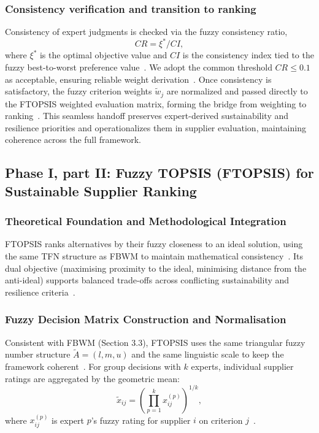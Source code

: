 \documentclass[preprint,12pt]{elsarticle}
\begin{document}
\subsubsection{Consistency verification and transition to ranking}
Consistency of expert judgments is checked via the fuzzy consistency ratio,
\[
CR=\xi^*/CI,
\]
where $\xi^*$ is the optimal objective value and $CI$ is the consistency index tied to the fuzzy best-to-worst preference value~\citep{rezaei_2019_nonlinear_bwm,guo_zhao_2017_fbwm}. We adopt the common threshold $CR \le 0.1$ as acceptable, ensuring reliable weight derivation~\citep{haseli_2024_sf_bwm_cis}.
Once consistency is satisfactory, the fuzzy criterion weights $\tilde{w}_j$ are normalized and passed directly to the FTOPSIS weighted evaluation matrix, forming the bridge from weighting to ranking~\citep{Afrasiabi_Tavana_DiCaprio_2022,petrovic_etal_2022_axioms_efqm_fbwm_fmoora}. This seamless handoff preserves expert-derived sustainability and resilience priorities and operationalizes them in supplier evaluation, maintaining coherence across the full framework.

\subsection{Phase I, part II: Fuzzy TOPSIS (FTOPSIS) for Sustainable Supplier Ranking}

\subsubsection{Theoretical Foundation and Methodological Integration}
FTOPSIS ranks alternatives by their fuzzy closeness to an ideal solution, using the same TFN structure as FBWM to maintain mathematical consistency~\citep{saleem_etal_2025_fuzzy_topsis_gscm,zare_etal_2023_pf_bwm_supplier}. Its dual objective (maximising proximity to the ideal, minimising distance from the anti-ideal) supports balanced trade-offs across conflicting sustainability and resilience criteria~\citep{amiri_aref_etal_2012_new_fuzzy_pnis_topsis}.

\subsubsection{Fuzzy Decision Matrix Construction and Normalisation}
Consistent with FBWM (Section 3.3), FTOPSIS uses the same triangular fuzzy number structure $\tilde{A}=(l,m,u)$ and the same linguistic scale to keep the framework coherent~\citep{zare_etal_2023_pf_bwm_supplier}.
For group decisions with $k$ experts, individual supplier ratings are aggregated by the geometric mean:
\[
\tilde{x}_{ij}=\left(\prod_{p=1}^{k} x_{ij}^{(p)}\right)^{1/k},
\]
where $x_{ij}^{(p)}$ is expert $p$'s fuzzy rating for supplier $i$ on criterion $j$~\citep{saghafian_hejazi_2005_modified_fuzzy_topsis,zare_etal_2023_pf_bwm_supplier}.
\end{document}
